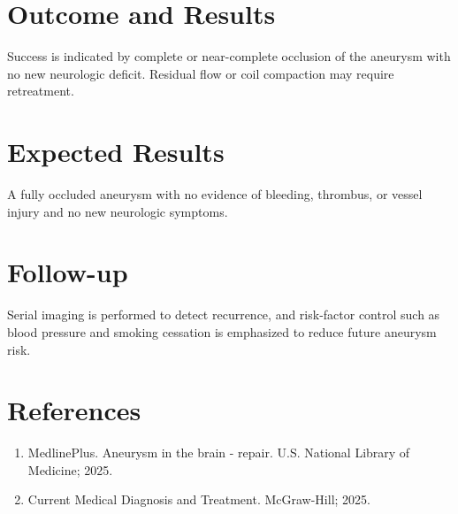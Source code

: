 \section*{Outcome and Results}
Success is indicated by complete or near-complete occlusion of the aneurysm with no new neurologic deficit. Residual flow or coil compaction may require retreatment.
\section*{Expected Results}
A fully occluded aneurysm with no evidence of bleeding, thrombus, or vessel injury and no new neurologic symptoms.
\section*{Follow-up}
Serial imaging is performed to detect recurrence, and risk-factor control such as blood pressure and smoking cessation is emphasized to reduce future aneurysm risk.
\section*{References}
\begin{enumerate}
  \item MedlinePlus. Aneurysm in the brain - repair. U.S. National Library of Medicine; 2025.
  \item Current Medical Diagnosis and Treatment. McGraw-Hill; 2025.
\end{enumerate}

\clearpage
